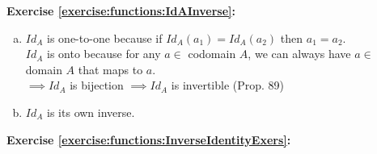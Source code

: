 \noindent\textbf{Exercise \ref{exercise:functions:IdAInverse}:}
\begin{enumerate}[(a)]
\item
$Id_A$ is one-to-one because if $Id_A(a_1)=Id_A(a_2)$ then $a_1=a_2$.\\
$Id_A$ is onto because for any $a\in$ codomain $A$, we can always have $a\in$ domain $A$ that maps to $a$.\\
$\implies Id_A$ is bijection $\implies Id_A$ is invertible (Prop. 89)

\item
$Id_A$ is its own inverse.
\end{enumerate}

\noindent\textbf{Exercise \ref{exercise:functions:InverseIdentityExers}:} %
